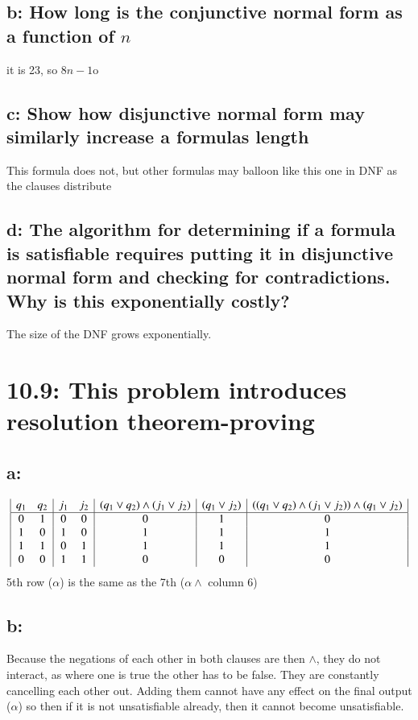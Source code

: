\documentclass{article}
\begin{document}
\subsection*{b: How long is the conjunctive normal form as a function of $n$}
it is 23, so $8n - 1$o\subsection*{c: Show how disjunctive normal form may similarly increase a formulas length}
This formula does not, but other formulas may balloon like this one in DNF as the clauses distribute
\subsection*{d: The algorithm for determining if a formula is satisfiable requires putting it in disjunctive normal form and checking for contradictions. Why is this exponentially costly?}
The size of the DNF grows exponentially.

\section*{10.9: This problem introduces resolution theorem-proving}
\subsection*{a:}
\begin{displaymath}
  \begin{array}{|c c|c c|c|c|c|}
    q_1 & q_2 & j_1 & j_2 & (q_1 \lor q_2) \land (j_1 \lor j_2) & (q_1 \lor j_2) & ((q_1 \lor q_2) \land (j_1 \lor j_2)) \land (q_1 \lor j_2) \\
    \hline
    0 & 1 & 0 & 0 & 0 & 1 & 0\\
    1 & 0 & 1 & 0 & 1 & 1 & 1\\
    1 & 1 & 0 & 1 & 1 & 1 & 1\\
    0 & 0 & 1 & 1 & 0 & 0 & 0\\
  \end{array}
\end{displaymath}
5th row ($\alpha$) is the same as the 7th ($\alpha \land$ column 6)
\subsection*{b:}
Because the negations of each other in both clauses are then $\land$, they do not interact, as where one is true the other has to be false. They are constantly cancelling each other out. Adding them cannot have any effect on the final output ($\alpha$) so then if it is not unsatisfiable already, then it cannot become unsatisfiable.
\end{document}
